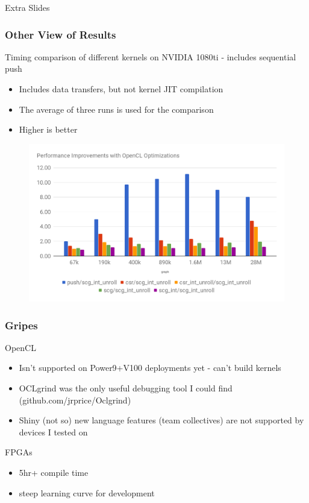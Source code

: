 \documentclass{beamer}
\begin{document}
\begin{frame}
  \center \huge Extra Slides
\end{frame}

\begin{frame}
  \frametitle{Other View of Results}
  \tiny
  Timing comparison of different kernels on NVIDIA 1080ti - includes sequential
  push
  \begin{itemize}
    \item Includes data transfers, but not kernel JIT compilation
    \item The average of three runs is used for the comparison
    \item Higher is better
  \end{itemize}
  \begin{figure}
    \centering
    \includegraphics[width=.9\textwidth]{results/bfs.png}
  \end{figure}  
\end{frame}

\begin{frame}
  \frametitle{Gripes}
  OpenCL 
  \begin{itemize}
    \item Isn't supported on Power9+V100 deployments yet - can't build kernels
    \item OCLgrind was the only useful debugging tool I could find (github.com/jrprice/Oclgrind)
    \item Shiny (not so) new language features (team collectives) are not supported by devices I tested on
  \end{itemize}
  FPGAs
  \begin{itemize}
    \item 5hr+ compile time
    \item steep learning curve for development
  \end{itemize}
\end{frame}
\end{document}
